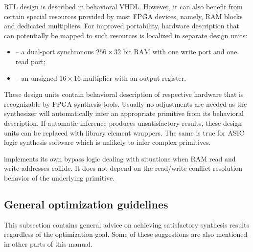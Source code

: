 \documentclass[a4paper,12pt,twoside,extrafontsizes]{memoir}
\begin{document}
\lxp{} RTL design is described in behavioral VHDL. However, it can also benefit from certain special resources provided by most FPGA devices, namely, RAM blocks and dedicated multipliers. For improved portability, hardware description that can potentially be mapped to such resources is localized in separate design units:

\begin{itemize}
	\item {} -- a dual-port synchronous $256 \times 32$ bit RAM with one write port and one read port;
	\item {} -- an unsigned $16 \times 16$ multiplier with an output register.
\end{itemize}

These design units contain behavioral description of respective hardware that is recognizable by FPGA synthesis tools. Usually no adjustments are needed as the synthesizer will automatically infer an appropriate primitive from its behavioral description. If automatic inference produces unsatisfactory results, these design units can be replaced with library element wrappers. The same is true for ASIC logic synthesis software which is unlikely to infer complex primitives.

\lxp{} implements its own bypass logic dealing with situations when RAM read and write addresses collide. It does not depend on the read/write conflict resolution behavior of the underlying primitive.

\subsection{General optimization guidelines}

This subsection contains general advice on achieving satisfactory synthesis results regardless of the optimization goal. Some of these suggestions are also mentioned in other parts of this manual.
\end{document}
